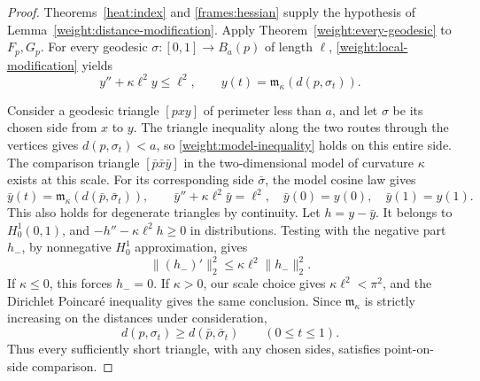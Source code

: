 \begin{proof}
Theorems~\ref{heat:index} and \ref{frames:hessian} supply the
hypothesis of Lemma~\ref{weight:distance-modification}.
Apply Theorem~\ref{weight:every-geodesic} to \(F_p,G_p\).
For every geodesic \(\sigma\colon[0,1]\to B_a(p)\) of length
\(\ell\), \eqref{weight:local-modification} yields
\begin{equation}
\label{weight:model-inequality}
y''+\kappa\ell^2y\le\ell^2,
\qquad y(t)=\mathfrak m_\kappa(d(p,\sigma_t)).
\end{equation}

Consider a geodesic triangle \([pxy]\) of perimeter less than
\(a\), and let \(\sigma\) be its chosen side from \(x\) to
\(y\). The triangle inequality along the two routes through
the vertices gives \(d(p,\sigma_t)<a\), so
\eqref{weight:model-inequality} holds on this entire side.
The comparison triangle \([\bar p\bar x\bar y]\) in the
two-dimensional model of curvature \(\kappa\) exists at this
scale. For its corresponding side \(\bar\sigma\), the model
cosine law gives
\[
\bar y(t)=\mathfrak m_\kappa(d(\bar p,\bar\sigma_t)),\qquad
\bar y''+\kappa\ell^2\bar y=\ell^2,
\quad \bar y(0)=y(0),\quad\bar y(1)=y(1).
\]
This also holds for degenerate triangles by continuity.
Let \(h=y-\bar y\). It belongs to \(H^1_0(0,1)\), and
\(-h''-\kappa\ell^2h\ge0\) in distributions.
Testing with the negative part \(h_-\), by nonnegative
\(H^1_0\) approximation, gives
\[
\|(h_-)'\|_2^2\le\kappa\ell^2\|h_-\|_2^2.
\]
If \(\kappa\le0\), this forces \(h_-=0\). If \(\kappa>0\),
our scale choice gives \(\kappa\ell^2<\pi^2\), and the
Dirichlet Poincar\'e inequality gives the same conclusion.
Since \(\mathfrak m_\kappa\) is strictly increasing on the
distances under consideration,
\begin{equation}
\label{weight:point-side}
d(p,\sigma_t)\ge d(\bar p,\bar\sigma_t)
\qquad(0\le t\le1).
\end{equation}
Thus every sufficiently short triangle, with any chosen sides,
satisfies point-on-side comparison.


\end{proof}
